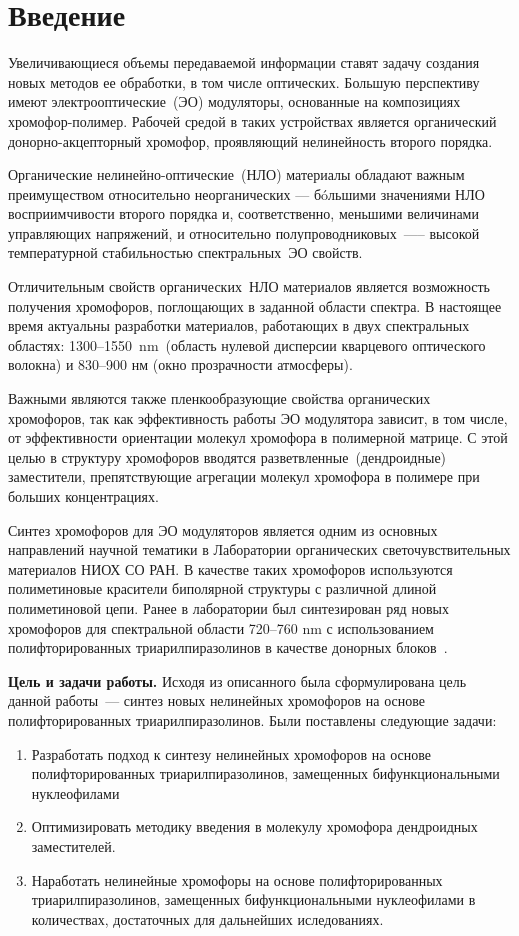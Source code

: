 \section{Введение}
Увеличивающиеся объемы передаваемой информации ставят задачу создания новых методов ее обработки, в том числе оптических. Большую перспективу имеют электрооптические~(ЭО) модуляторы, основанные на композициях хромофор-полимер. Рабочей средой в таких устройствах является органический донорно-акцепторный хромофор, проявляющий нелинейность второго порядка.

Органические нелинейно-оптические~(НЛО) материалы обладают важным преимуществом относительно неорганических — бóльшими значениями НЛО восприимчивости второго порядка и, соответственно, меньшими величинами управляющих напряжений, и относительно полупроводниковых~—-- высокой температурной стабильностью спектральных~ЭО свойств.

Отличительным свойств органических~НЛО материалов является возможность получения хромофоров, поглощающих в заданной области спектра. В настоящее время актуальны разработки материалов, работающих в двух спектральных областях: 1300--1550~\si{\nano\metre}~(область нулевой дисперсии кварцевого оптического волокна) и 830--900 нм (окно прозрачности атмосферы). 

Важными являются также пленкообразующие свойства органических хромофоров, так как эффективность работы ЭО модулятора зависит, в том числе, от эффективности ориентации молекул хромофора в полимерной матрице. С этой целью в структуру хромофоров вводятся разветвленные~(дендроидные) заместители, препятствующие агрегации молекул хромофора в полимере при больших концентрациях.

Синтез хромофоров для ЭО модуляторов является одним из основных направлений научной тематики в Лаборатории органических светочувствительных материалов НИОХ СО РАН. В качестве таких хромофоров используются полиметиновые красители биполярной структуры с различной длиной полиметиновой цепи. Ранее в лаборатории был синтезирован ряд новых хромофоров для спектральной области 720--760 \si{\nano\metre} с использованием полифторированных триарилпиразолинов в качестве донорных блоков~\cite{2019}.

\textbf{Цель и задачи работы.}
Исходя из описанного была сформулирована цель данной работы~--- синтез новых нелинейных хромофоров на основе полифторированных триарилпиразолинов.
Были поставлены следующие задачи:
\begin{enumerate}
    \item Разработать подход к синтезу нелинейных хромофоров на основе полифторированных триарилпиразолинов, замещенных бифункциональными нуклеофилами
    \item Оптимизировать методику введения в молекулу хромофора дендроидных заместителей.
    \item Наработать нелинейные хромофоры на основе полифторированных триарилпиразолинов, замещенных бифункциональными нуклеофилами в количествах, достаточных для дальнейших иследованиях.
\end{enumerate}

